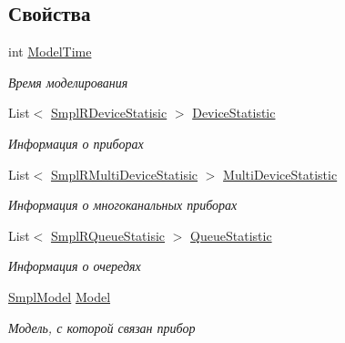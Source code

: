 \subsection*{Свойства}
\begin{DoxyCompactItemize}
\item 
int \hyperlink{class_s_m_p_l_sharp_1_1_utils_1_1_smpl_reporter_a0115cc791c67a57ba79083c12d4f163b}{Model\-Time}
\begin{DoxyCompactList}\small\item\em Время моделирования \end{DoxyCompactList}\item 
List$<$ \hyperlink{class_s_m_p_l_sharp_1_1_utils_1_1_smpl_r_device_statisic}{Smpl\-R\-Device\-Statisic} $>$ \hyperlink{class_s_m_p_l_sharp_1_1_utils_1_1_smpl_reporter_ae368c8f35be0449aa5c5f52ddcc0ea0b}{Device\-Statistic}
\begin{DoxyCompactList}\small\item\em Информация о приборах \end{DoxyCompactList}\item 
List$<$ \hyperlink{class_s_m_p_l_sharp_1_1_utils_1_1_smpl_r_multi_device_statisic}{Smpl\-R\-Multi\-Device\-Statisic} $>$ \hyperlink{class_s_m_p_l_sharp_1_1_utils_1_1_smpl_reporter_abef5661d7d82934362ad8504796b31af}{Multi\-Device\-Statistic}
\begin{DoxyCompactList}\small\item\em Информация о многоканальных приборах \end{DoxyCompactList}\item 
List$<$ \hyperlink{class_s_m_p_l_sharp_1_1_utils_1_1_smpl_r_queue_statisic}{Smpl\-R\-Queue\-Statisic} $>$ \hyperlink{class_s_m_p_l_sharp_1_1_utils_1_1_smpl_reporter_a242251fbbe1facd190ed723f52285bfb}{Queue\-Statistic}
\begin{DoxyCompactList}\small\item\em Информация о очередях \end{DoxyCompactList}\item 
\hyperlink{class_s_m_p_l_sharp_1_1_smpl_model}{Smpl\-Model} \hyperlink{class_s_m_p_l_sharp_1_1_utils_1_1_smpl_reporter_af01db9140661991e99d6978c250ff4c1}{Model}
\begin{DoxyCompactList}\small\item\em Модель, с которой связан прибор \end{DoxyCompactList}\end{DoxyCompactItemize}


